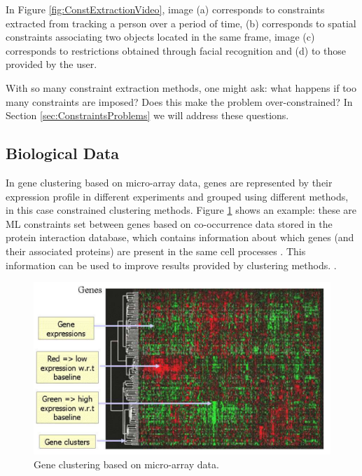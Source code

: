 In Figure \ref{fig:ConstExtractionVideo}, image (a) corresponds to constraints extracted from tracking a person over a period of time, (b) corresponds to spatial constraints associating two objects located in the same frame, image (c) corresponds to restrictions obtained through facial recognition and (d) to those provided by the user.

With so many constraint extraction methods, one might ask: what happens if too many constraints are imposed? Does this make the problem over-constrained? In Section \ref{sec:ConstraintsProblems} we will address these questions.

\subsection{Biological Data}

In gene clustering based on micro-array data, genes are represented by their expression profile in different experiments and grouped using different methods, in this case constrained clustering methods. Figure \ref{fig:GeneticApp} shows an example: these are \acf{ML} constraints set between genes based on co-occurrence data stored in the protein interaction database, which contains information about which genes (and their associated proteins) are present in the same cell processes \cite{xenarios2001dip}. This information can be used to improve results provided by clustering methods. \cite{segal2003discovering}.

\begin{figure}[!h]
	\centering
	\includegraphics[scale=0.3]{gfx/ConstClust/Genetica/Genes} 
	\caption[Gene clustering based on micro-array data.]{Gene clustering based on micro-array data. \cite{davidson2007survey}}\label{fig:GeneticApp}
\end{figure}

